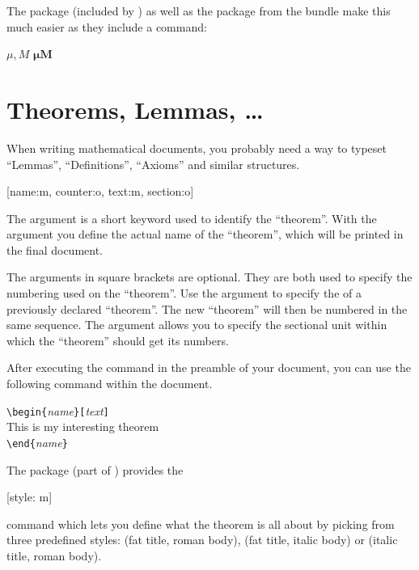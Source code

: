 The package  (included by ) as well as the
package  from the  bundle make this much easier as they include
a  command:

\begin{example}
$\mu, M$
$\boldsymbol{\mu}
  \boldsymbol{M}$
\end{example}

\section{Theorems, Lemmas, \ldots}

When writing mathematical documents, you probably need a way to
typeset ``Lemmas'', ``Definitions'', ``Axioms'' and similar
structures.
\begin{lscommand}
  [name:m, counter:o, text:m, section:o]
\end{lscommand}
The  argument is a short keyword used to identify the
``theorem''. With the  argument you define the actual name
of the ``theorem'', which will be printed in the final document.

The arguments in square brackets are optional. They are both used to
specify the numbering used on the ``theorem''. Use  the 
argument to specify the  of a previously declared
``theorem''. The new ``theorem'' will then be numbered in the same
sequence.  The  argument allows you to specify the
sectional unit within which the ``theorem'' should get its numbers.

After executing the  command in the preamble of your
document, you can use the following command within the document.
\begin{code}
\verb|\begin{|\emph{name}\verb|}[|\emph{text}\verb|]|\\
This is my interesting theorem\\
\verb|\end{|\emph{name}\verb|}|     
\end{code}

The  package (part of ) provides the
\begin{lscommand}
  [style: m]
\end{lscommand}
command which lets you define what the theorem is all about by picking
from three predefined styles:  (fat title, roman body),
 (fat title, italic body) or  (italic
title, roman body).

